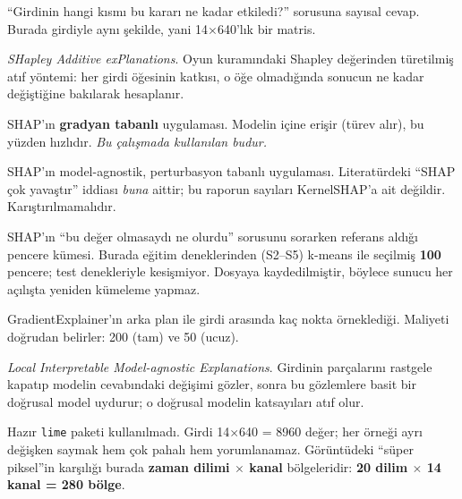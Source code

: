 \documentclass[11pt,a4paper]{report}
\newcommand{\kod}[1]{\texttt{\small #1}}
\begin{document}
\begin{tanim}[Açıklayıcılar]
\begin{description}[leftmargin=0pt,style=nextline,itemsep=0.35em]

\item[Atıf (attribution)] ``Girdinin hangi kısmı bu kararı ne kadar
etkiledi?'' sorusuna sayısal cevap. Burada girdiyle aynı şekilde, yani
14$\times$640'lık bir matris.

\item[SHAP] \emph{SHapley Additive exPlanations}. Oyun kuramındaki Shapley
değerinden türetilmiş atıf yöntemi: her girdi öğesinin katkısı, o öğe
olmadığında sonucun ne kadar değiştiğine bakılarak hesaplanır.

\item[GradientExplainer] SHAP'ın \textbf{gradyan tabanlı} uygulaması. Modelin
içine erişir (türev alır), bu yüzden hızlıdır. \emph{Bu çalışmada kullanılan
budur.}

\item[KernelSHAP] SHAP'ın model-agnostik, perturbasyon tabanlı uygulaması.
Literatürdeki ``SHAP çok yavaştır'' iddiası \emph{buna} aittir; bu raporun
sayıları KernelSHAP'a ait değildir. Karıştırılmamalıdır.

\item[Arka plan kümesi (background set)] SHAP'ın ``bu değer olmasaydı ne
olurdu'' sorusunu sorarken referans aldığı pencere kümesi. Burada eğitim
deneklerinden (S2--S5) k-means ile seçilmiş \textbf{100} pencere; test
denekleriyle kesişmiyor. Dosyaya kaydedilmiştir, böylece sunucu her açılışta
yeniden kümeleme yapmaz.

\item[\kod{nsamples}] GradientExplainer'ın arka plan ile girdi arasında kaç
nokta örneklediği. Maliyeti doğrudan belirler: 200 (tam) ve 50 (ucuz).

\item[LIME] \emph{Local Interpretable Model-agnostic Explanations}. Girdinin
parçalarını rastgele kapatıp modelin cevabındaki değişimi gözler, sonra bu
gözlemlere basit bir doğrusal model uydurur; o doğrusal modelin katsayıları
atıf olur.

\item[Bölge tabanlı LIME (region-based LIME)] Hazır \kod{lime} paketi
kullanılmadı. Girdi 14$\times$640 = 8960 değer; her örneği ayrı değişken saymak
hem çok pahalı hem yorumlanamaz. Görüntüdeki ``süper piksel''in karşılığı burada
\textbf{zaman dilimi $\times$ kanal} bölgeleridir: \textbf{20 dilim
$\times$ 14 kanal = 280 bölge}.


\end{description}
\end{tanim}
\end{document}
